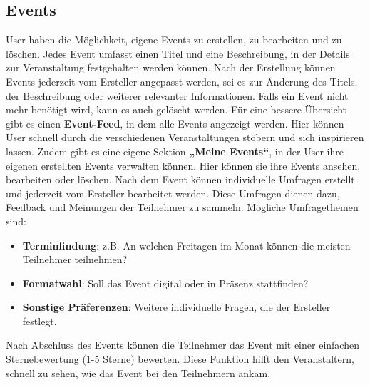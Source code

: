 \documentclass[a4paper,12pt]{article}
\begin{document}
\subsection{Events}
User haben die Möglichkeit, eigene Events zu erstellen, zu bearbeiten und zu löschen. Jedes Event umfasst einen Titel und eine Beschreibung, in der Details zur Veranstaltung festgehalten werden können. Nach der Erstellung können Events jederzeit vom Ersteller angepasst werden, sei es zur Änderung des Titels, der Beschreibung oder weiterer relevanter Informationen. Falls ein Event nicht mehr benötigt wird, kann es auch gelöscht werden. Für eine bessere Übersicht gibt es einen \textbf{Event-Feed}, in dem alle Events angezeigt werden. Hier können User schnell durch die verschiedenen Veranstaltungen stöbern und sich inspirieren lassen. Zudem gibt es eine eigene Sektion \textbf{„Meine Events“}, in der User ihre eigenen erstellten Events verwalten können. Hier können sie ihre Events ansehen, bearbeiten oder löschen. Nach dem Event können individuelle Umfragen erstellt und jederzeit vom Ersteller bearbeitet werden. Diese Umfragen dienen dazu, Feedback und Meinungen der Teilnehmer zu sammeln. Mögliche Umfragethemen sind:
\begin{itemize}
    \item \textbf{Terminfindung}: z.B. An welchen Freitagen im Monat können die meisten Teilnehmer teilnehmen?
    \item \textbf{Formatwahl}: Soll das Event digital oder in Präsenz stattfinden?
    \item \textbf{Sonstige Präferenzen}: Weitere individuelle Fragen, die der Ersteller festlegt.
\end{itemize}
Nach Abschluss des Events können die Teilnehmer das Event mit einer einfachen Sternebewertung (1-5 Sterne) bewerten. Diese Funktion hilft den Veranstaltern, schnell zu sehen, wie das Event bei den Teilnehmern ankam.

\newpage

\end{document}
